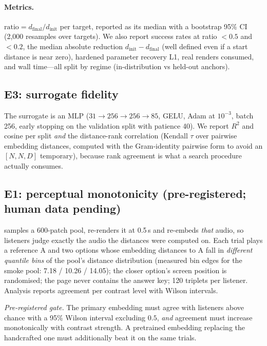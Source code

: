 \documentclass[11pt]{article}
\newcommand{\code}[1]{\texttt{\detokenize{#1}}}
\begin{document}
\paragraph{Metrics.}
$\text{ratio} = d_{\text{final}}/d_{\text{init}}$ per target, reported as its
median with a bootstrap 95\% CI (2{,}000 resamples over targets). We also report
success rates at ratio $<0.5$ and $<0.2$, the median absolute reduction
$d_{\text{init}} - d_{\text{final}}$ (well defined even if a start distance is
near zero), hardened parameter recovery L1, real renders consumed, and wall
time---all split by regime (in-distribution vs held-out anchors).

\subsection{E3: surrogate fidelity}\label{sec:e3}

The surrogate is an MLP ($31 \rightarrow 256 \rightarrow 256 \rightarrow 85$,
GELU, Adam at $10^{-3}$, batch 256, early stopping on the validation split with
patience 40). We report $R^2$ and cosine per split \emph{and} the distance-rank
correlation (Kendall $\tau$ over pairwise embedding distances, computed with the
Gram-identity pairwise form to avoid an $[N,N,D]$ temporary), because rank
agreement is what a search procedure actually consumes.

\subsection{E1: perceptual monotonicity (pre-registered; human data pending)}\label{sec:e1}

\code{python -m timbreprobe.cli e1} samples a 600-patch pool, re-renders it at
0.5\,s and re-embeds \emph{that} audio, so listeners judge exactly the audio the
distances were computed on. Each trial plays a reference A and two options whose
embedding distances to A fall in \emph{different quantile bins} of the pool's
distance distribution (measured bin edges for the smoke pool: 7.18 / 10.26 /
14.05); the closer option's screen position is randomised; the page never
contains the answer key; 120 triplets per listener. Analysis reports agreement
per contrast level with Wilson intervals.

\emph{Pre-registered gate.} The primary embedding must agree with listeners
above chance with a 95\% Wilson interval excluding $0.5$, \emph{and} agreement
must increase monotonically with contrast strength. A pretrained embedding
replacing the handcrafted one must additionally beat it on the same trials.
\end{document}
